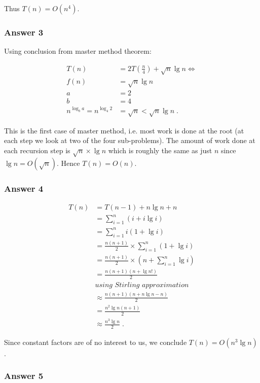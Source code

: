 \documentclass[11pt]{article}
\begin{document}
Thus \(T(n) = O(n^4)\).

\subsubsection{Answer 3}
\label{sec:orgheadline3}
Using conclusion from master method theorem:

\begin{align*}
  T(n) &= 2T\left(\frac{n}{4}\right) + \sqrt{n} \lg n \iff \\
  f(n) &= \sqrt{n} \lg n \\
  a &= 2 \\
  b &= 4 \\
  n^{\log_b a} = n^{\log_4 2} &= \sqrt{n} < \sqrt{n} \lg n\;.
\end{align*}

This is the first case of master method, i.e. most work is done at the root
(at each step we look at two of the four sub-problems).  The amount of work
done at each recursion step is \(\sqrt{n}\times \lg n\) which is roughly the
same as just \(n\) since \(\lg n = O(\sqrt{n})\).  Hence \(T(n) = O(n)\).

\subsubsection{Answer 4}
\label{sec:orgheadline4}

\begin{align*}
  T(n) &= T(n - 1) + n \lg n + n \\
       &= \sum_{i = 1}^n(i + i \lg i) \\
       &= \sum_{i = 1}^ni(1 + \lg i) \\
       &= \frac{n(n + 1)}{2} \times \sum_{i = 1}^n(1 + \lg i) \\
       &= \frac{n(n + 1)}{2} \times \left(n + \sum_{i = 1}^n \lg i \right) \\
       &= \frac{n(n + 1)(n + \lg n!)}{2} \\
       &\textit{using Stirling approximation} \\
       &\approx \frac{n(n + 1)(n + n \lg n - n)}{2} \\
       &= \frac{n^2 \lg n(n + 1)}{2} \\
       &\approx \frac{n^3 \lg n}{2} \;.
\end{align*}

Since constant factors are of no interest to us, we conclude \(T(n) = O(n^3
    \lg n)\).

\subsubsection{Answer 5}
\label{sec:orgheadline5}
\end{document}
